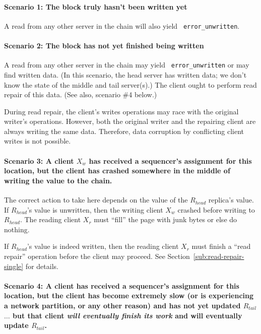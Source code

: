 \documentclass[preprint,10pt]{sigplanconf}
\begin{document}
\paragraph{Scenario 1: The block truly hasn't been written yet}

A read from any other server in the chain will also yield {\tt
  error\_unwritten}.

\paragraph{Scenario 2: The block has not yet finished being written}

A read from any other server in the chain may yield {\tt
  error\_unwritten} or may find written data.  (In this scenario, the
head server has written data; we don't know the state of the middle
and tail server(s).)  The client ought to perform read repair of this
data.  (See also, scenario \#4 below.)

During read repair, the client's writes operations may race with the
original writer's operations.  However, both the original writer and
the repairing client are always writing the same data.  Therefore,
data corruption by conflicting client writes is not possible.  

\paragraph{Scenario 3: A client $X_w$ has received a sequencer's
  assignment for this
  location, but the client has crashed somewhere in the middle of
  writing the value to the chain.}

The correct action to take here depends on the value of the $R_{head}$
replica's value.  If $R_{head}$'s value is unwritten, then the writing
client $X_w$ crashed before writing to $R_{head}$.  The reading client
$X_r$ must ``fill'' the page with junk bytes or else do nothing.

If $R_{head}$'s value is indeed written, then the reading client $X_r$
must finish a ``read repair'' operation before the client may proceed.
See Section~\ref{sub:read-repair-single} for details.

\paragraph{Scenario 4: A client has received a sequencer's assignment for this
  location, but the client has become extremely slow (or is
  experiencing a network partition, or any other reason) and has not
  yet updated $R_{tail}$ $\ldots$ but that client {\em will eventually
    finish its work} and will eventually update $R_{tail}$.}
\end{document}
